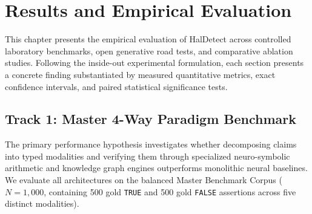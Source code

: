 \chapter{Results and Empirical Evaluation}
\label{ch:results}

This chapter presents the empirical evaluation of HalDetect across controlled laboratory benchmarks, open generative road tests, and comparative ablation studies. Following the inside-out experimental formulation, each section presents a concrete finding substantiated by measured quantitative metrics, exact confidence intervals, and paired statistical significance tests.

\section{Track 1: Master 4-Way Paradigm Benchmark}
\label{sec:track1_results}

The primary performance hypothesis investigates whether decomposing claims into typed modalities and verifying them through specialized neuro-symbolic arithmetic and knowledge graph engines outperforms monolithic neural baselines. We evaluate all architectures on the balanced Master Benchmark Corpus ($N = 1,000$, containing 500 gold \texttt{TRUE} and 500 gold \texttt{FALSE} assertions across five distinct modalities).

\begin{table}[htbp]
\centering
\small
\caption{Comparative performance on the symmetrical Master Benchmark Corpus ($N=1,000$). All confidence intervals report 95\% Wilson score intervals. Statistical significance ($p$-value) is computed via paired exact binomial McNemar tests against the Non-Routed baseline.}
\label{tab:master_4way_benchmark}
\end{table}

